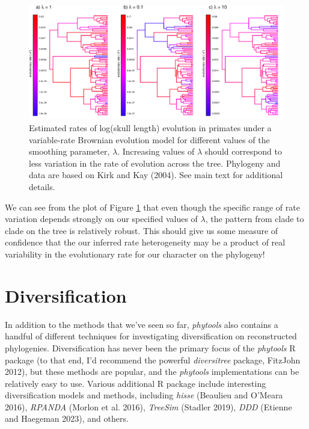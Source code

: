 \documentclass[fleqn,10pt,lineno]{wlpeerj} %
\begin{document}
\begin{figure}
\includegraphics[width=1\linewidth]{Revell.phytools-v2_peerj_files/figure-latex/fig15-multirateBM-1} \caption{Estimated rates of log(skull length) evolution in primates under a variable-rate Brownian evolution model for different values of the smoothing parameter, $\lambda$. Increasing values of $\lambda$ should correspond to less variation in the rate of evolution across the tree. Phylogeny and data are based on Kirk and Kay (2004). See main text for additional details.}\label{fig:fig15-multirateBM}
\end{figure}

We can see from the plot of Figure \ref{fig:fig15-multirateBM} that even though the specific range of rate variation depends strongly on our specified values of \(\lambda\), the pattern from clade to clade on the tree is relatively robust. This should give us some measure of confidence that the our inferred rate heterogeneity may be a product of real variability in the evolutionary rate for our character on the phylogeny!

\hypertarget{diversification}{%
\section{Diversification}\label{diversification}}

In addition to the methods that we've seen so far, \emph{phytools} also contains a handful of different techniques for investigating diversification on reconstructed phylogenies. Diversification has never been the primary focus of the \emph{phytools} R package (to that end, I'd recommend the powerful \emph{diversitree} package, FitzJohn 2012), but these methods are popular, and the \emph{phytools} implementations can be relatively easy to use. Various additional R package include interesting diversification models and methods, including \emph{hisse} (Beaulieu and O'Meara 2016), \emph{RPANDA} (Morlon et al. 2016), \emph{TreeSim} (Stadler 2019), \emph{DDD} (Etienne and Haegeman 2023), and others.
\end{document}
